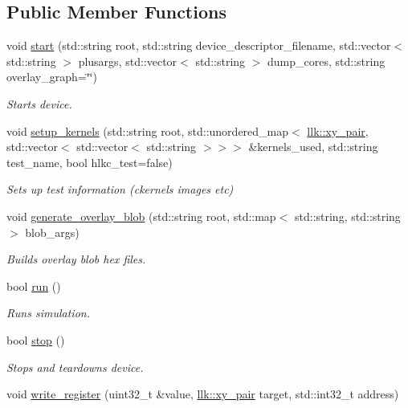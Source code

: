 \subsection*{Public Member Functions}
\begin{DoxyCompactItemize}
\item 
void \hyperlink{classllk_1_1Device_a4be879d10344eab03473e53e41cc14b8}{start} (std\+::string root, std\+::string device\+\_\+descriptor\+\_\+filename, std\+::vector$<$ std\+::string $>$ plusargs, std\+::vector$<$ std\+::string $>$ dump\+\_\+cores, std\+::string overlay\+\_\+graph=\char`\"{}\char`\"{})
\begin{DoxyCompactList}\small\item\em Starts device. \end{DoxyCompactList}\item 
void \hyperlink{classllk_1_1Device_a8e68d577fd5c160567e31dc0518bd6e9}{setup\+\_\+kernels} (std\+::string root, std\+::unordered\+\_\+map$<$ \hyperlink{structllk_1_1xy__pair}{llk\+::xy\+\_\+pair}, std\+::vector$<$ std\+::vector$<$ std\+::string $>$$>$$>$ \&kernels\+\_\+used, std\+::string test\+\_\+name, bool hlkc\+\_\+test=false)
\begin{DoxyCompactList}\small\item\em Sets up test information (ckernels images etc) \end{DoxyCompactList}\item 
void \hyperlink{classllk_1_1Device_a15b42f2d1a734de7cd14b33a93bb87e2}{generate\+\_\+overlay\+\_\+blob} (std\+::string root, std\+::map$<$ std\+::string, std\+::string $>$ blob\+\_\+args)
\begin{DoxyCompactList}\small\item\em Builds overlay blob hex files. \end{DoxyCompactList}\item 
bool \hyperlink{classllk_1_1Device_a70a42e9710b3c971685f38733852e90e}{run} ()
\begin{DoxyCompactList}\small\item\em Runs simulation. \end{DoxyCompactList}\item 
bool \hyperlink{classllk_1_1Device_a6f6a546079d7c976635093e85ef6d348}{stop} ()
\begin{DoxyCompactList}\small\item\em Stops and teardowns device. \end{DoxyCompactList}\item 
void \hyperlink{classllk_1_1Device_ad0bcc94a905851a6c78bb84873ff780d}{write\+\_\+register} (uint32\+\_\+t \&value, \hyperlink{structllk_1_1xy__pair}{llk\+::xy\+\_\+pair} target, std\+::int32\+\_\+t address)

\end{DoxyCompactItemize}
